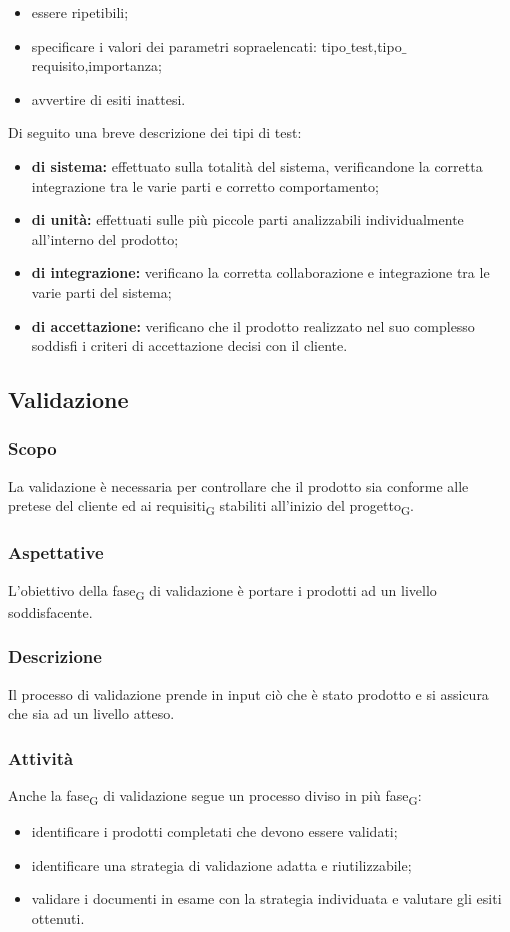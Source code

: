     \begin{itemize}
    	\item essere ripetibili;
    	\item specificare i valori dei parametri sopraelencati: tipo$\_$test,tipo$\_$requisito,importanza;
    	\item avvertire di esiti inattesi.
    \end{itemize}
	Di seguito una breve descrizione dei tipi di test:
	\begin{itemize}
		\item \textbf{di sistema:} effettuato sulla totalità del sistema, verificandone la corretta integrazione tra le varie parti e corretto comportamento;
		\item \textbf{di unità:} effettuati sulle più piccole parti analizzabili individualmente all'interno del prodotto;
		\item \textbf{di integrazione:} verificano la corretta collaborazione e integrazione tra le varie parti del sistema;
		\item \textbf{di accettazione:} verificano che il prodotto realizzato nel suo complesso soddisfi i criteri di accettazione decisi con il cliente.
	\end{itemize}
\subsection{Validazione}
    \subsubsection{Scopo}
    La validazione è necessaria per controllare che il prodotto sia conforme alle pretese del cliente ed ai requisiti\textsubscript{G} stabiliti all'inizio del progetto\textsubscript{G}.
    \subsubsection{Aspettative}
    L'obiettivo della fase\textsubscript{G} di validazione è portare i prodotti ad un livello soddisfacente.
    \subsubsection{Descrizione}
    Il processo di validazione prende in input ciò che è stato prodotto e si assicura che sia ad un livello atteso.
    \subsubsection{Attività}
    Anche la fase\textsubscript{G} di validazione segue un processo diviso in più fase\textsubscript{G}:
    \begin{itemize}
    	\item identificare i prodotti completati che devono essere validati;
    	\item identificare una strategia di validazione adatta e riutilizzabile;
    	\item validare i documenti in esame con la strategia individuata e valutare gli esiti ottenuti.
    \end{itemize}


